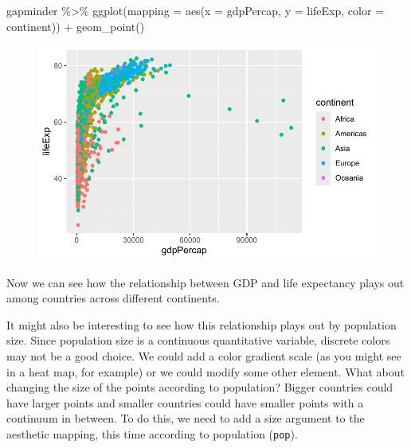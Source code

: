 \documentclass[
  letterpaper,
]{book}
\newenvironment{Shaded}{\begin{snugshade}}{\end{snugshade}}
\newcommand{\AttributeTok}[1]{\textcolor[rgb]{0.40,0.45,0.13}{#1}}
\newcommand{\FunctionTok}[1]{\textcolor[rgb]{0.28,0.35,0.67}{#1}}
\newcommand{\NormalTok}[1]{\textcolor[rgb]{0.00,0.23,0.31}{#1}}
\newcommand{\SpecialCharTok}[1]{\textcolor[rgb]{0.37,0.37,0.37}{#1}}
\begin{document}
\begin{Shaded}
\begin{Highlighting}[]
\NormalTok{gapminder }\SpecialCharTok{\%\textgreater{}\%}
  \FunctionTok{ggplot}\NormalTok{(}\AttributeTok{mapping =} \FunctionTok{aes}\NormalTok{(}\AttributeTok{x =}\NormalTok{ gdpPercap, }
                       \AttributeTok{y =}\NormalTok{ lifeExp,}
                       \AttributeTok{color =}\NormalTok{ continent)) }\SpecialCharTok{+}
  \FunctionTok{geom\_point}\NormalTok{()}
\end{Highlighting}
\end{Shaded}

\begin{figure}[H]

{\centering \includegraphics{visualizing-with-ggplot_files/figure-pdf/unnamed-chunk-18-1.pdf}

}

\end{figure}

Now we can see how the relationship between GDP and life expectancy
plays out among countries across different continents.

It might also be interesting to see how this relationship plays out by
population size. Since population size is a continuous quantitative
variable, discrete colors may not be a good choice. We could add a color
gradient scale (as you might see in a heat map, for example) or we could
modify some other element. What about changing the size of the points
according to population? Bigger countries could have larger points and
smaller countries could have smaller points with a continuum in between.
To do this, we need to add a size argument to the aesthetic mapping,
this time according to population (\texttt{pop}).
\end{document}
